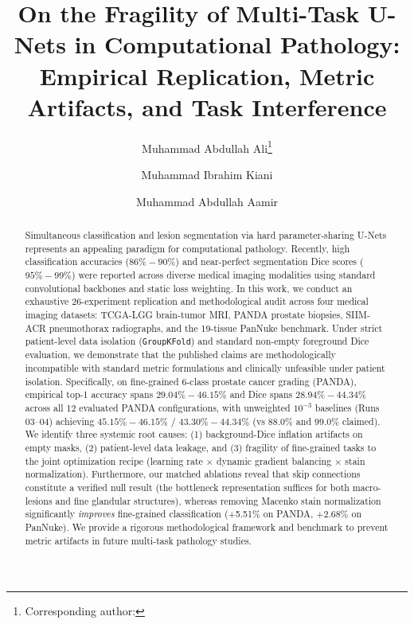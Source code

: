\documentclass[runningheads]{llncs}
\begin{document}
\title{On the Fragility of Multi-Task U-Nets in Computational Pathology: Empirical Replication, Metric Artifacts, and Task Interference}

\author{Muhammad Abdullah Ali\thanks{Corresponding author: } \and
Muhammad Ibrahim Kiani \and
Muhammad Abdullah Aamir}

\maketitle

\begin{abstract}
Simultaneous classification and lesion segmentation via hard parameter-sharing U-Nets represents an appealing paradigm for computational pathology. Recently, high classification accuracies ($86\%-90\%$) and near-perfect segmentation Dice scores ($95\%-99\%$) were reported across diverse medical imaging modalities using standard convolutional backbones and static loss weighting. In this work, we conduct an exhaustive 26-experiment replication and methodological audit across four medical imaging datasets: TCGA-LGG brain-tumor MRI, PANDA prostate biopsies, SIIM-ACR pneumothorax radiographs, and the 19-tissue PanNuke benchmark. Under strict patient-level data isolation (\texttt{GroupKFold}) and standard non-empty foreground Dice evaluation, we demonstrate that the published claims are methodologically incompatible with standard metric formulations and clinically unfeasible under patient isolation. Specifically, on fine-grained 6-class prostate cancer grading (PANDA), empirical top-1 accuracy spans $29.04\%-46.15\%$ and Dice spans $28.94\%-44.34\%$ across all 12 evaluated PANDA configurations, with unweighted $10^{-3}$ baselines (Runs 03--04) achieving $45.15\%-46.15\%$ / $43.30\%-44.34\%$ (vs $88.0\%$ and $99.0\%$ claimed). We identify three systemic root causes: (1) background-Dice inflation artifacts on empty masks, (2) patient-level data leakage, and (3) fragility of fine-grained tasks to the joint optimization recipe (learning rate $\times$ dynamic gradient balancing $\times$ stain normalization). Furthermore, our matched ablations reveal that skip connections constitute a verified null result (the bottleneck representation suffices for both macro-lesions and fine glandular structures), whereas removing Macenko stain normalization significantly \emph{improves} fine-grained classification (+5.51\% on PANDA, +2.68\% on PanNuke). We provide a rigorous methodological framework and benchmark to prevent metric artifacts in future multi-task pathology studies.

\end{abstract}
\end{document}

